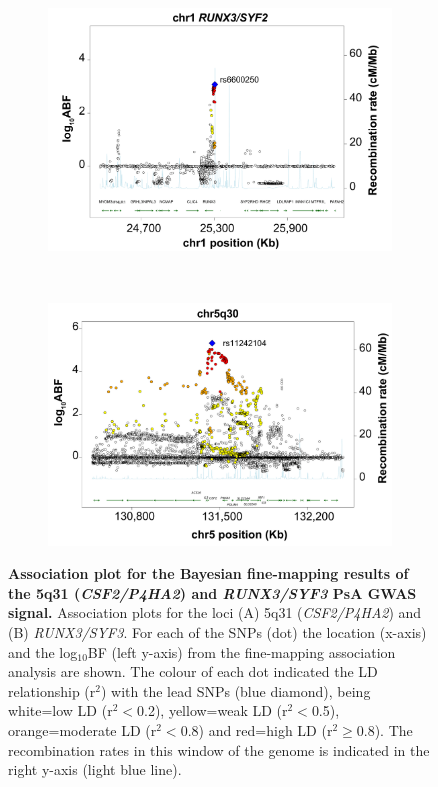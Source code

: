 \begin{figure}[htbp]
\centering
\begin{subfigure}[b]{0.5\textwidth}
\centering 
\includegraphics[width=\textwidth]{./Results3/pdfs/PSA_FM_Immunochip_RUNX3_association_plot}%
\caption{}
\end{subfigure}%
~
\begin{subfigure}[b]{0.5\textwidth}
\centering 
\includegraphics[width=\textwidth]{./Results3/pdfs/PSA_FM_Immunochip_5q31_association_plot}%
\caption{}
\end{subfigure}%
\caption[Association plot for the Bayesian fine-mapping results of the 5q31 (\textit{CSF2/P4HA2}) and \textit{RUNX3/SYF3} PsA GWAS signal.]{\textbf{Association plot for the Bayesian fine-mapping results of the 5q31 (\textit{CSF2/P4HA2}) and \textit{RUNX3/SYF3} PsA GWAS signal.} Association plots for the loci (A) 5q31 (\textit{CSF2/P4HA2}) and (B) \textit{RUNX3/SYF3}. For each of the SNPs (dot) the location (x-axis) and the log$_{10}$BF (left y-axis) from the fine-mapping association analysis are shown. The colour of each dot indicated the LD relationship (r$^2$) with the lead SNPs (blue diamond), being white=low LD (r$^{2}<$0.2), yellow=weak LD (r$^{2}<$0.5), orange=moderate LD (r$^{2}<$0.8) and red=high LD (r$^{2}$$\geq$0.8). The recombination rates in this window of the genome is indicated in the right y-axis (light blue line).}
\label{figure:RUNX3_chr5q31_fine_mapping_association_plot}
\end{figure}


